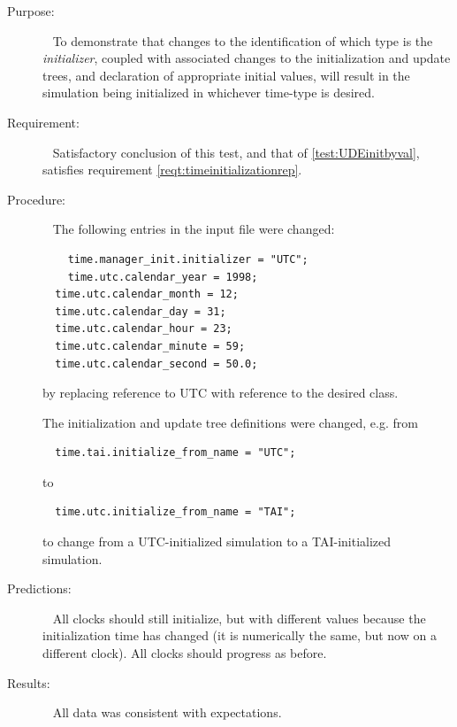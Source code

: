   \label{test:STDinitbytype}
\begin{description}
\item[Purpose:]\ \newline
To demonstrate that changes to the identification of which type is the \textit{initializer}, coupled with associated changes to the initialization and update trees, and declaration of appropriate initial values, will result in the simulation being initialized in whichever time-type is desired. 

\item[Requirement:]\ \newline
Satisfactory conclusion of this test, and that of \ref{test:UDEinitbyval}, satisfies requirement \ref{reqt:timeinitializationrep}.

\item[Procedure:]\ \newline
The following entries in the input file were changed:
\begin{verbatim}
	time.manager_init.initializer = "UTC";
	time.utc.calendar_year = 1998;
  time.utc.calendar_month = 12; 
  time.utc.calendar_day = 31; 
  time.utc.calendar_hour = 23; 
  time.utc.calendar_minute = 59; 
  time.utc.calendar_second = 50.0;
\end{verbatim}
by replacing reference to UTC with reference to the desired class.

The initialization and update tree definitions were changed, e.g. from
\begin{verbatim}
  time.tai.initialize_from_name = "UTC";
\end{verbatim}
to 
\begin{verbatim}
  time.utc.initialize_from_name = "TAI";
\end{verbatim}
to change from a UTC-initialized simulation to a TAI-initialized simulation.
  
\item[Predictions:]\ \newline
All clocks should still initialize, but with different values because the initialization time has changed (it is numerically the same, but now on a different clock).
All clocks should progress as before.

\item[Results:]\ \newline
All data was consistent with expectations.

\end{description}





